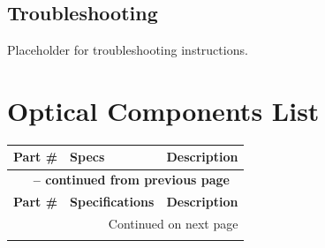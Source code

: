 \documentclass[11pt, letterpaper]{article}
\begin{document}
\subsection{Troubleshooting}
Placeholder for troubleshooting instructions.

\newpage
\section{Optical Components List}

\begin{longtable}{@{} p{} p{} p{} @{}}
\toprule
\textbf{Part \#} & \textbf{Specs} & \textbf{Description} \\
\midrule
\endfirsthead

\multicolumn{3}{c}{{\bfseries \tablename\ \thetable{} -- continued from previous page}} \\
\toprule
\textbf{Part \#} & \textbf{Specifications} & \textbf{Description} \\
\midrule
\endhead

\midrule \multicolumn{3}{r}{{Continued on next page}} \\
\endfoot

\bottomrule
\endlastfoot


\end{longtable}
\end{document}
